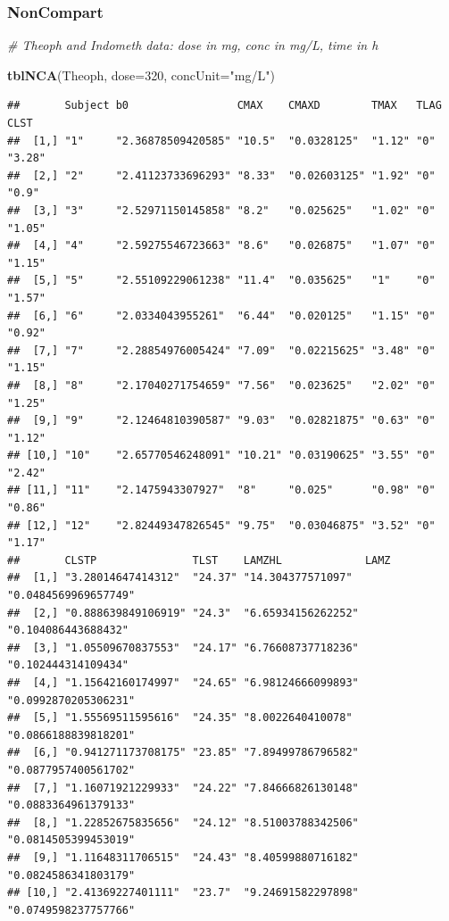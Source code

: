 \documentclass[]{krantz}
\makeatletter
\newenvironment{Shaded}{\begin{snugshade}}{\end{snugshade}}
\newcommand{\KeywordTok}[1]{\textcolor[rgb]{0.13,0.29,0.53}{\textbf{#1}}}
\newcommand{\DataTypeTok}[1]{\textcolor[rgb]{0.13,0.29,0.53}{#1}}
\newcommand{\DecValTok}[1]{\textcolor[rgb]{0.00,0.00,0.81}{#1}}
\newcommand{\StringTok}[1]{\textcolor[rgb]{0.31,0.60,0.02}{#1}}
\newcommand{\CommentTok}[1]{\textcolor[rgb]{0.56,0.35,0.01}{\textit{#1}}}
\newcommand{\NormalTok}[1]{#1}
\newenvironment{kframe}{%
\medskip{}
\setlength{\fboxsep}{.8em}
 \def\at@end@of@kframe{}%
 \ifinner\ifhmode%
  \def\at@end@of@kframe{\end{minipage}}%
  \begin{minipage}{\columnwidth}%
 \fi\fi%
 \def\FrameCommand##1{\hskip\@totalleftmargin \hskip-\fboxsep
 \colorbox{shadecolor}{##1}\hskip-\fboxsep
     \hskip-\linewidth \hskip-\@totalleftmargin \hskip\columnwidth}%
 \MakeFramed {\advance\hsize-\width
   \@totalleftmargin\z@ \linewidth\hsize
   \@setminipage}}%
 {\par\unskip\endMakeFramed%
 \at@end@of@kframe}
\renewenvironment{Shaded}{\begin{kframe}}{\end{kframe}}
\theoremstyle{definition}
\theoremstyle{definition}
\theoremstyle{definition}
\theoremstyle{remark}
\makeatother
\begin{document}
\subsubsection{NonCompart}\label{noncompart}

\begin{Shaded}
\begin{Highlighting}[]
\CommentTok{# Theoph and Indometh data: dose in mg, conc in mg/L, time in h}

\KeywordTok{tblNCA}\NormalTok{(Theoph, }\DataTypeTok{dose=}\DecValTok{320}\NormalTok{, }\DataTypeTok{concUnit=}\StringTok{"mg/L"}\NormalTok{)}
\end{Highlighting}
\end{Shaded}

\begin{verbatim}
##       Subject b0                 CMAX    CMAXD        TMAX   TLAG CLST  
##  [1,] "1"     "2.36878509420585" "10.5"  "0.0328125"  "1.12" "0"  "3.28"
##  [2,] "2"     "2.41123733696293" "8.33"  "0.02603125" "1.92" "0"  "0.9" 
##  [3,] "3"     "2.52971150145858" "8.2"   "0.025625"   "1.02" "0"  "1.05"
##  [4,] "4"     "2.59275546723663" "8.6"   "0.026875"   "1.07" "0"  "1.15"
##  [5,] "5"     "2.55109229061238" "11.4"  "0.035625"   "1"    "0"  "1.57"
##  [6,] "6"     "2.0334043955261"  "6.44"  "0.020125"   "1.15" "0"  "0.92"
##  [7,] "7"     "2.28854976005424" "7.09"  "0.02215625" "3.48" "0"  "1.15"
##  [8,] "8"     "2.17040271754659" "7.56"  "0.023625"   "2.02" "0"  "1.25"
##  [9,] "9"     "2.12464810390587" "9.03"  "0.02821875" "0.63" "0"  "1.12"
## [10,] "10"    "2.65770546248091" "10.21" "0.03190625" "3.55" "0"  "2.42"
## [11,] "11"    "2.1475943307927"  "8"     "0.025"      "0.98" "0"  "0.86"
## [12,] "12"    "2.82449347826545" "9.75"  "0.03046875" "3.52" "0"  "1.17"
##       CLSTP               TLST    LAMZHL             LAMZ                
##  [1,] "3.28014647414312"  "24.37" "14.304377571097"  "0.0484569969657749"
##  [2,] "0.888639849106919" "24.3"  "6.65934156262252" "0.104086443688432" 
##  [3,] "1.05509670837553"  "24.17" "6.76608737718236" "0.102444314109434" 
##  [4,] "1.15642160174997"  "24.65" "6.98124666099893" "0.0992870205306231"
##  [5,] "1.55569511595616"  "24.35" "8.0022640410078"  "0.0866188839818201"
##  [6,] "0.941271173708175" "23.85" "7.89499786796582" "0.0877957400561702"
##  [7,] "1.16071921229933"  "24.22" "7.84666826130148" "0.0883364961379133"
##  [8,] "1.22852675835656"  "24.12" "8.51003788342506" "0.0814505399453019"
##  [9,] "1.11648311706515"  "24.43" "8.40599880716182" "0.0824586341803179"
## [10,] "2.41369227401111"  "23.7"  "9.24691582297898" "0.0749598237757766"

\end{verbatim}
\end{document}
